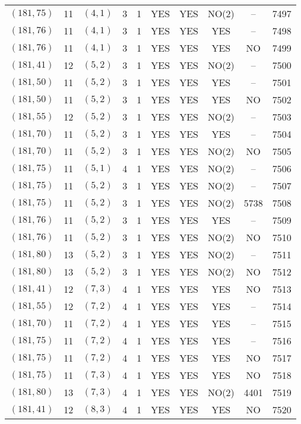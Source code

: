 \begin{longtable}{|c|c|c|c|c|c|c|c|c|c|}
$(181, 75)$ & 11 & $(4, 1)$ & 3 & 1 & YES & YES & NO(2) & -- & 7497\\
$(181, 76)$ & 11 & $(4, 1)$ & 3 & 1 & YES & YES & YES & -- & 7498\\
$(181, 76)$ & 11 & $(4, 1)$ & 3 & 1 & YES & YES & YES & NO & 7499\\
$(181, 41)$ & 12 & $(5, 2)$ & 3 & 1 & YES & YES & NO(2) & -- & 7500\\
$(181, 50)$ & 11 & $(5, 2)$ & 3 & 1 & YES & YES & YES & -- & 7501\\
$(181, 50)$ & 11 & $(5, 2)$ & 3 & 1 & YES & YES & YES & NO & 7502\\
$(181, 55)$ & 12 & $(5, 2)$ & 3 & 1 & YES & YES & NO(2) & -- & 7503\\
$(181, 70)$ & 11 & $(5, 2)$ & 3 & 1 & YES & YES & YES & -- & 7504\\
$(181, 70)$ & 11 & $(5, 2)$ & 3 & 1 & YES & YES & NO(2) & NO & 7505\\
$(181, 75)$ & 11 & $(5, 1)$ & 4 & 1 & YES & YES & NO(2) & -- & 7506\\
$(181, 75)$ & 11 & $(5, 2)$ & 3 & 1 & YES & YES & NO(2) & -- & 7507\\
$(181, 75)$ & 11 & $(5, 2)$ & 3 & 1 & YES & YES & NO(2) & 5738 & 7508\\
$(181, 76)$ & 11 & $(5, 2)$ & 3 & 1 & YES & YES & YES & -- & 7509\\
$(181, 76)$ & 11 & $(5, 2)$ & 3 & 1 & YES & YES & NO(2) & NO & 7510\\
$(181, 80)$ & 13 & $(5, 2)$ & 3 & 1 & YES & YES & NO(2) & -- & 7511\\
$(181, 80)$ & 13 & $(5, 2)$ & 3 & 1 & YES & YES & NO(2) & NO & 7512\\
$(181, 41)$ & 12 & $(7, 3)$ & 4 & 1 & YES & YES & YES & NO & 7513\\
$(181, 55)$ & 12 & $(7, 2)$ & 4 & 1 & YES & YES & YES & -- & 7514\\
$(181, 70)$ & 11 & $(7, 2)$ & 4 & 1 & YES & YES & YES & -- & 7515\\
$(181, 75)$ & 11 & $(7, 2)$ & 4 & 1 & YES & YES & YES & -- & 7516\\
$(181, 75)$ & 11 & $(7, 2)$ & 4 & 1 & YES & YES & YES & NO & 7517\\
$(181, 75)$ & 11 & $(7, 3)$ & 4 & 1 & YES & YES & YES & NO & 7518\\
$(181, 80)$ & 13 & $(7, 3)$ & 4 & 1 & YES & YES & NO(2) & 4401 & 7519\\
$(181, 41)$ & 12 & $(8, 3)$ & 4 & 1 & YES & YES & YES & NO & 7520\\

\end{longtable}
